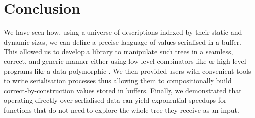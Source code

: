 \section{Conclusion}

We have seen how, using a universe of descriptions indexed by their static
and dynamic sizes, we can define a precise language of values serialised in
a buffer.
%
This allowed us to develop a library to manipulate such trees in a seamless,
correct, and generic manner either using low-level combinators like
 or high-level programs like a data-polymorphic
.
%
We then provided users with convenient tools to write serialisation processes
thus allowing them to compositionally build correct-by-construction values
stored in buffers.
%
Finally, we demonstrated that operating directly over serlialised data can
yield exponential speedups for functions that do not need to explore the
whole tree they receive as an input.
